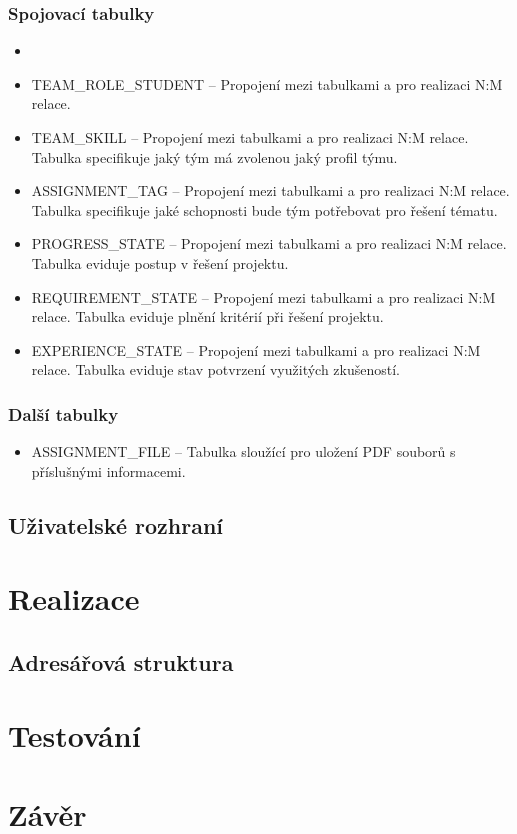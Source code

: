 \documentclass[czech,BP]{thesiskiv}
\begin{document}
		\subsection{Spojovací tabulky}
			\begin{itemize}
				\item
				\item TEAM\_ROLE\_STUDENT -- Propojení mezi tabulkami  a  pro realizaci N:M relace. 
				\item TEAM\_SKILL -- Propojení mezi tabulkami  a  pro realizaci N:M relace. Tabulka specifikuje jaký tým má zvolenou jaký profil týmu.
				\item ASSIGNMENT\_TAG -- Propojení mezi tabulkami  a  pro realizaci N:M relace. Tabulka specifikuje jaké schopnosti bude tým potřebovat pro řešení tématu.
				\item PROGRESS\_STATE -- Propojení mezi tabulkami  a  pro realizaci N:M relace. Tabulka eviduje postup v řešení projektu.
				\item REQUIREMENT\_STATE -- Propojení mezi tabulkami  a  pro realizaci N:M relace. Tabulka eviduje plnění kritérií při řešení projektu.
				\item EXPERIENCE\_STATE -- Propojení mezi tabulkami  a  pro realizaci N:M relace. Tabulka eviduje stav potvrzení využitých zkušeností.
			\end{itemize}
		\subsection{Další tabulky}
			\begin{itemize}
				\item ASSIGNMENT\_FILE -- Tabulka sloužící pro uložení PDF souborů s příslušnými informacemi.
			\end{itemize}
	\section{Uživatelské rozhraní}
\chapter{Realizace}
	\section{Adresářová struktura}
\chapter{Testování}

\chapter{Závěr}

% 
%

{\raggedright\small

}
\end{document}

